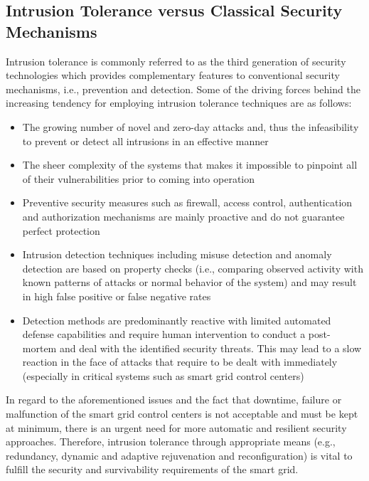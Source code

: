 \documentclass[preprint,number,12pt]{elsarticle}
\begin{document}
\subsection{Intrusion Tolerance versus Classical Security Mechanisms}
Intrusion tolerance is commonly referred to as the third generation of security technologies\citep{springerlink:10.1007/978-3-642-23971-7_36} which provides complementary features to conventional security mechanisms, i.e., prevention and detection. Some of the driving forces behind the increasing tendency for employing intrusion tolerance techniques are as follows:
\begin{itemize}
\item The growing number of novel and zero-day attacks and, thus the infeasibility to prevent or detect all intrusions in an effective manner\citep{Verissimo2006}
\item The sheer complexity of the systems that makes it impossible to pinpoint all of their vulnerabilities prior to coming into operation \citep{Saidane2009a}
\item Preventive security measures such as firewall, access control, authentication and authorization mechanisms are mainly proactive \citep{Uemura2010} and do not guarantee perfect protection\citep{Verissimo2006}
\item Intrusion detection techniques including misuse detection  and anomaly 
detection are based on property checks (i.e., comparing observed activity with 
known patterns of attacks or normal behavior of the system)
\citep{Deswarte2006432} and may result in high false positive or false negative 
rates
\item  Detection methods are predominantly reactive with limited automated 
defense capabilities and require human intervention to conduct a post-mortem 
and deal with the identified security threats\citep{Wang2003b}. This may lead 
to a slow reaction in the face of attacks that require to be dealt with immediately (especially in critical systems such as smart grid control centers)
\end{itemize}

In regard to the aforementioned issues and the fact that downtime, failure or malfunction of the smart grid control centers is not acceptable and must be kept at minimum, there is an urgent need for more automatic and resilient security approaches. Therefore, intrusion tolerance through appropriate means (e.g., redundancy, dynamic and adaptive rejuvenation and reconfiguration) is vital to fulfill the security and survivability requirements of the smart grid.
\end{document}
